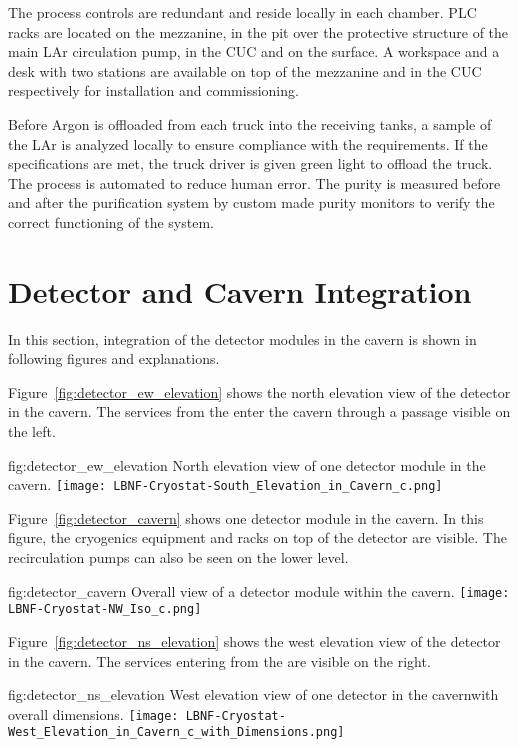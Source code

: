 The process controls are redundant and reside locally in each
chamber. PLC racks are located on the mezzanine, in the pit over the
protective structure of the main LAr circulation pump, in the CUC and
on the surface. A workspace and a desk with two stations are available
on top of the mezzanine and in the CUC respectively for installation
and commissioning.

Before Argon is offloaded from each truck into the receiving tanks, a
sample of the LAr is analyzed locally to ensure compliance with the
requirements. If the specifications are met, the truck driver is given
green light to offload the truck. The process is automated to reduce
human error. The purity is measured before and after the purification
system by custom made purity monitors to verify the correct
functioning of the system.


\section{Detector and Cavern Integration}
\label{sec:fdsp-coord-det-cav-integ}
In this section, integration of the detector modules in the cavern is
shown in following figures and explanations.

Figure~\ref{fig:detector_ew_elevation} shows the north
elevation view of the detector in the cavern. The services from the
 enter the cavern through a passage visible on the left.
\begin{dunefigure}{fig:detector_ew_elevation}
  {North elevation view of one detector module in the cavern.}
  \texttt{[image: LBNF-Cryostat-South\_Elevation\_in\_Cavern\_c.png]}
\end{dunefigure}

Figure~\ref{fig:detector_cavern} shows one detector module in the
cavern. In this figure, the cryogenics equipment and racks on top of
the detector are visible. The  recirculation pumps can also be seen
on the lower level.
\begin{dunefigure}{fig:detector_cavern}
  {Overall view of a detector module within the cavern.}
  \texttt{[image: LBNF-Cryostat-NW\_Iso\_c.png]}
\end{dunefigure}

Figure~\ref{fig:detector_ns_elevation} shows the west
elevation view of the detector in the cavern. The services entering
from the  are visible on the right.
\begin{dunefigure}{fig:detector_ns_elevation}
  {West elevation view of one detector in the cavernwith overall dimensions.}
  \texttt{[image: LBNF-Cryostat-West\_Elevation\_in\_Cavern\_c\_with\_Dimensions.png]}
\end{dunefigure}

